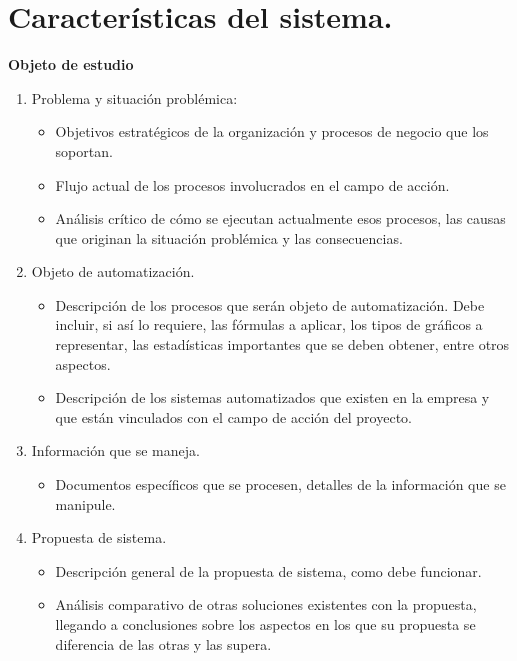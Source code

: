 \chapter{\large Características del sistema.}


\pagestyle{fancy}
\lhead{}
\chead{}
\lfoot{}
\cfoot{}
\rfoot{\thepage}
\renewcommand{\headrulewidth}{0.4pt}
 \vspace{-1cm}


\lettrine[lines=2, lraise=0, nindent=0em, slope=-.5em]{{\bf O}}{}{\bf bjeto de estudio}


\begin{enumerate}
 \item Problema y situación problémica: 
	\begin{itemize}
	 \item Objetivos estratégicos de la organización y procesos de negocio que los soportan.
	 \item Flujo actual de los procesos involucrados en el campo de acción.
	 \item Análisis crítico de cómo se ejecutan actualmente esos procesos, las causas que originan la situación problémica y las consecuencias.
	\end{itemize}
 \item Objeto de automatización.
	\begin{itemize}
	 \item Descripción de los procesos que serán objeto de automatización. Debe incluir, si así lo requiere, las fórmulas a aplicar, los tipos de gráficos a representar, las estadísticas importantes que se deben obtener, entre otros aspectos. 
	 \item Descripción de los sistemas automatizados que existen en la empresa y que están vinculados con el campo de acción del proyecto.
	\end{itemize}
 \item Información que se maneja.
	\begin{itemize}
	 \item Documentos específicos que se procesen, detalles de la información que se manipule.
	\end{itemize}
 \item Propuesta de sistema.
	\begin{itemize}
	 \item Descripción general de la propuesta de sistema, como debe funcionar.
	 \item Análisis comparativo de otras soluciones existentes con la propuesta, llegando a conclusiones sobre los aspectos en los que su propuesta se diferencia de las otras y las supera.

\end{itemize}
\end{enumerate}
